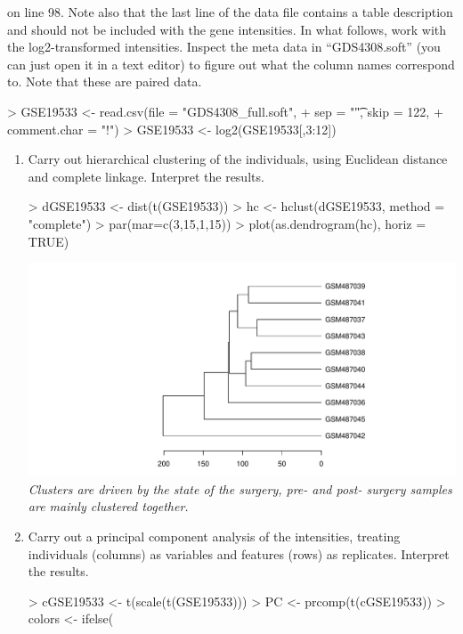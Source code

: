 \documentclass[12pt,a4paper]{paper}
\begin{document}
\begin{enumerate}
on line 98. Note also that the last line of the data file contains a table description and should
not be included with the gene intensities. In what follows, work with the log2-transformed
intensities. Inspect the meta data in “GDS4308.soft” (you can just open it in a text editor)
to figure out what the column names correspond to. Note that these are paired data.
\begin{Schunk}
\begin{Sinput}
> GSE19533 <- read.csv(file = "GDS4308_full.soft", 
+                      sep = "\t", skip = 122, 
+                      comment.char = "!")
> GSE19533 <- log2(GSE19533[,3:12])
\end{Sinput}
\end{Schunk}
\begin{enumerate}
\item Carry out hierarchical clustering of the individuals, using Euclidean distance and complete linkage. Interpret the results.
\begin{Schunk}
\begin{Sinput}
> dGSE19533 <- dist(t(GSE19533))
> hc <- hclust(dGSE19533, method = "complete")
> par(mar=c(3,15,1,15))
> plot(as.dendrogram(hc), horiz = TRUE)
\end{Sinput}
\end{Schunk}
\includegraphics{Osorio_Daniel_HW2-007}
\\\textit{Clusters are driven by the state of the surgery, pre- and post- surgery samples are mainly clustered together.}
\item Carry out a principal component analysis of the intensities, treating individuals (columns)
as variables and features (rows) as replicates. Interpret the results.
\begin{Schunk}
\begin{Sinput}
> cGSE19533 <- t(scale(t(GSE19533)))
> PC <- prcomp(t(cGSE19533))
> colors <- ifelse(

\end{Sinput}
\end{Schunk}
\end{enumerate}
\end{enumerate}
\end{document}
